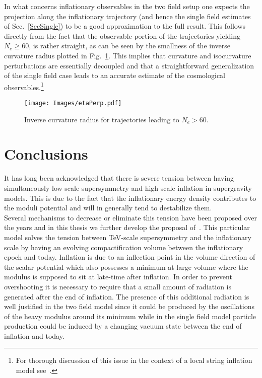 \documentclass[12pt,a4paper]{book}
\begin{document}
In what concerns inflationary observables in the two field setup one expects the projection along the inflationary trajectory (and hence the single field estimates of Sec.~\ref{SecSingle}) to be a good approximation to the full result. This follows directly from the fact that the observable portion of the trajectories yielding $N_e\ge 60$, is rather straight, as can be seen by the smallness of the inverse curvature radius plotted in Fig.~\ref{fig:2FieldLVS}. This implies that curvature and isocurvature perturbations are essentially decoupled and that a straightforward generalization of the single field case leads to an accurate estimate of the cosmological observables.\footnote{For thorough discussion of this issue in the context of a local string inflation model see~\cite{Bielleman:2015lka}.}
\begin{figure}[ht!]
\centering
{\texttt{[image: Images/etaPerp.pdf]}} 
\caption{Inverse curvature radius for trajectories leading to $N_e>60.$}
\label{fig:2FieldLVS}
\end{figure}



\section{Conclusions}
\label{SecConcl}

It has long been acknowledged that there is severe tension between having simultaneously low-scale supersymmetry and high scale inflation in supergravity models. This is due to the fact that the inflationary energy density contributes to the moduli potential and will in generally tend to destabilize them.\\

Several mechanisms to decrease or eliminate this tension have been proposed over the years and in this thesis we further develop the proposal of~\cite{Conlon:2008cj}. This particular model solves the tension between TeV-scale supersymmetry and the inflationary scale by having an evolving compactification volume between the inflationary epoch and today. Inflation is due to an inflection point in the volume direction of the scalar potential which also possesses a minimum at large volume where the modulus is supposed to sit at late-time after inflation. In order to prevent overshooting it is necessary to require that a small amount of radiation is generated after the end of inflation. The presence of this additional radiation is well justified in the two field model since it could be produced by the oscillations of the heavy modulus around its minimum while in the single field model particle production could be induced by a changing vacuum state between the end of inflation and today.\\
\end{document}
